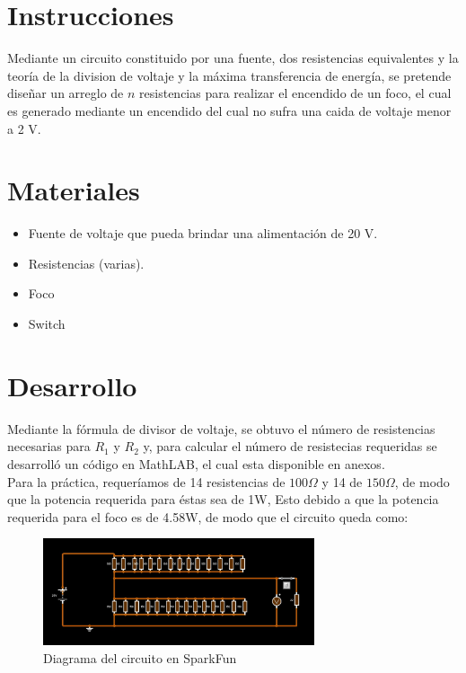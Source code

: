 \documentclass[]{article}
\begin{document}
\section{Instrucciones}

Mediante un circuito constituido por una fuente, dos resistencias equivalentes y
la teoría de la division de voltaje y la máxima transferencia de energía, se
pretende diseñar un arreglo de $n$ resistencias para realizar el encendido de
un foco, el cual es generado mediante un encendido del cual no sufra una caida
de voltaje menor a 2 V.

\section{Materiales}

\begin{itemize}
    \item Fuente de voltaje que pueda brindar una alimentación de 20 V.
    \item Resistencias (varias).
    \item Foco
    \item Switch
    \end{itemize}


\section{Desarrollo}

Mediante la fórmula de divisor de voltaje, se obtuvo el número de resistencias necesarias 
para $R_1$ y $R_2$ y, para calcular el número de resistecias requeridas se desarrolló un código en MathLAB, el cual esta disponible en anexos.\\

Para la práctica, requeríamos de 14 resistencias de $100 \Omega$  y 14 de $150 \Omega$, de modo que la potencia requerida para éstas sea de 1W, 
Esto debido a que la potencia requerida para el foco es de 4.58W, de modo que el circuito queda como:
\clearpage

\begin{figure}
    \centering
    \includegraphics[width=8cm]{build/Imagenes/Circuito1.jpg}
    \caption{Diagrama del circuito en SparkFun}
\end{figure}
    
\end{document}
